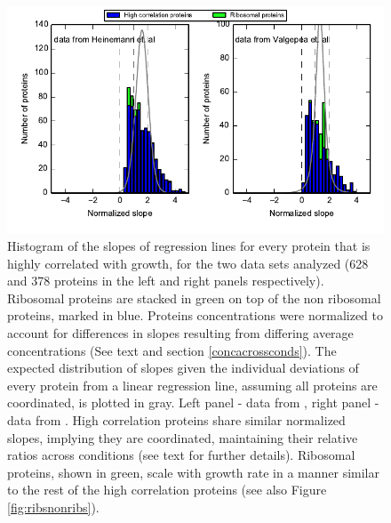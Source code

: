 \documentclass[a4paper]{article}
\begin{document}
\begin{figure}[H]
\begin{center}
\includegraphics[width=1\columnwidth]{AllProtsVSRibosomalNormalizedSlopes.pdf}
\caption{\label{fig:globalfit}
    Histogram of the slopes of regression lines for every protein that is highly correlated with growth, for the two data sets analyzed (628 and 378 proteins in the left and right panels respectively).
    Ribosomal proteins are stacked in green on top of the non ribosomal proteins, marked in blue.
    Proteins concentrations were normalized to account for differences in slopes resulting from differing average concentrations (See text and section \ref{concacrossconds}).
    The expected distribution of slopes given the individual deviations of every protein from a linear regression line, assuming all proteins are coordinated, is plotted in gray.
    Left panel - data from \cite{Heinemann2015}, right panel - data from \cite{Valgepea2013}.
    High correlation proteins share similar normalized slopes, implying they are coordinated, maintaining their relative ratios across conditions (see text for further details).
    Ribosomal proteins, shown in green, scale with growth rate in a manner similar to the rest of the high correlation proteins (see also Figure \ref{fig:ribsnonribs}).
}
\end{center}
\end{figure}
\end{document}

